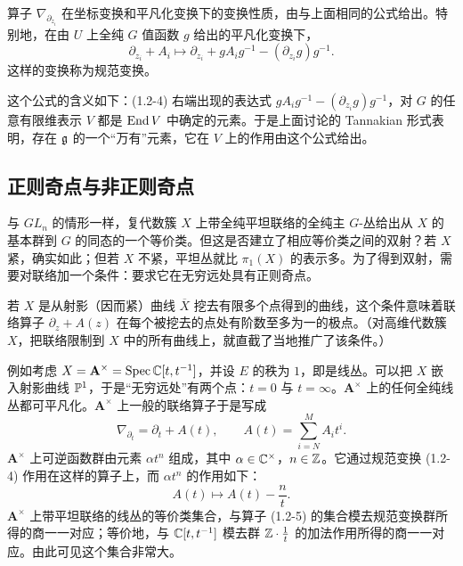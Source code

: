 算子 $\nabla_{\partial_{z_i}}$ 在坐标变换和平凡化变换下的变换性质，由与上面相同的公式给出。特别地，在由 $U$ 上全纯 $G$ 值函数 $g$ 给出的平凡化变换下，
\begin{equation}
    \partial_{z_i}+A_i\longmapsto \partial_{z_i}+gA_ig^{-1}-(\partial_{z_i}g)g^{-1}.
    \tag{1.2-4}
\end{equation}
这样的变换称为规范变换。

这个公式的含义如下：(1.2-4) 右端出现的表达式 $gA_ig^{-1}-(\partial_{z_i}g)g^{-1}$，对 $G$ 的任意有限维表示 $V$ 都是 $\operatorname{End} V$ 中确定的元素。于是上面讨论的 Tannakian 形式表明，存在 $\mathfrak{g}$ 的一个“万有”元素，它在 $V$ 上的作用由这个公式给出。

\subsection{正则奇点与非正则奇点}

与 $GL_n$ 的情形一样，复代数簇 $X$ 上带全纯平坦联络的全纯主 $G$-丛给出从 $X$ 的基本群到 $G$ 的同态的一个等价类。但这是否建立了相应等价类之间的双射？若 $X$ 紧，确实如此；但若 $X$ 不紧，平坦丛就比 $\pi_1(X)$ 的表示多。为了得到双射，需要对联络加一个条件：要求它在无穷远处具有正则奇点。

若 $X$ 是从射影（因而紧）曲线 $\overline{X}$ 挖去有限多个点得到的曲线，这个条件意味着联络算子 $\partial_z+A(z)$ 在每个被挖去的点处有阶数至多为一的极点。（对高维代数簇 $X$，把联络限制到 $X$ 中的所有曲线上，就直截了当地推广了该条件。）

例如考虑 $X=\mathbf{A}^\times=\operatorname{Spec}\mathbb{C}[t,t^{-1}]$，并设 $E$ 的秩为 $1$，即是线丛。可以把 $X$ 嵌入射影曲线 $\mathbb{P}^1$，于是“无穷远处”有两个点：$t=0$ 与 $t=\infty$。$\mathbf{A}^\times$ 上的任何全纯线丛都可平凡化。$\mathbf{A}^\times$ 上一般的联络算子于是写成
\begin{equation}
    \nabla_{\partial_t}=\partial_t+A(t),\qquad
    A(t)=\sum_{i=N}^{M}A_it^i.
    \tag{1.2-5}
\end{equation}
$\mathbf{A}^\times$ 上可逆函数群由元素 $\alpha t^n$ 组成，其中 $\alpha\in\mathbb{C}^\times$，$n\in\mathbb{Z}$。它通过规范变换 (1.2-4) 作用在这样的算子上，而 $\alpha t^n$ 的作用如下：
\[
    A(t)\longmapsto A(t)-\frac{n}{t}.
\]
$\mathbf{A}^\times$ 上带平坦联络的线丛的等价类集合，与算子 (1.2-5) 的集合模去规范变换群所得的商一一对应；等价地，与 $\mathbb{C}[t,t^{-1}]$ 模去群 $\mathbb{Z}\cdot\frac{1}{t}$ 的加法作用所得的商一一对应。由此可见这个集合非常大。

